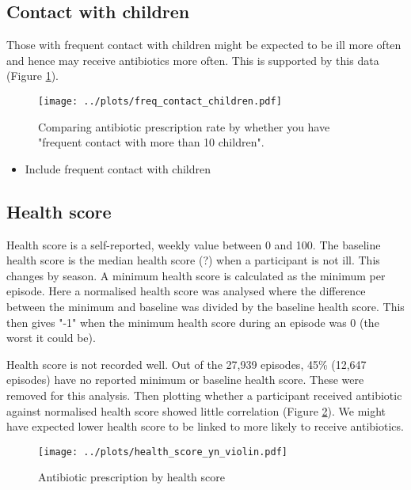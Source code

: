 \documentclass{article}
\begin{document}
\subsection{Contact with children}

Those with frequent contact with children might be expected to be ill more often and hence may receive antibiotics more often. This is supported by this data (Figure \ref{fig:childf}). 

	\begin{figure}[htbp]
		\centering
		\texttt{[image: ../plots/freq\_contact\_children.pdf]}
		\caption{Comparing antibiotic prescription rate by whether you have "frequent contact with more than 10 children". }
		\label{fig:childf}
	\end{figure} 

	\begin{itemize}
	\item Include frequent contact with children
\end{itemize}

\subsection{Health score}

Health score is a self-reported, weekly value between 0 and 100. The baseline health score is the median health score (?) when a participant is not ill. This changes by season. A minimum health score is calculated as the minimum per episode. Here a normalised health score was analysed where the difference between the minimum and baseline was divided by the baseline health score. This then gives "-1" when the minimum health score during an episode was 0 (the worst it could be). 

Health score is not recorded well. Out of the 27,939 episodes, 45\% (12,647 episodes) have no reported minimum or baseline health score. These were removed for this analysis. Then plotting whether a participant received antibiotic against normalised health score showed little correlation (Figure \ref{fig:hsf}). We might have expected lower health score to be linked to more likely to receive antibiotics. 

	\begin{figure}[htbp]
		\centering
		\texttt{[image: ../plots/health\_score\_yn\_violin.pdf]}
		\caption{Antibiotic prescription by health score}
		\label{fig:hsf}
	\end{figure} 
\end{document}
